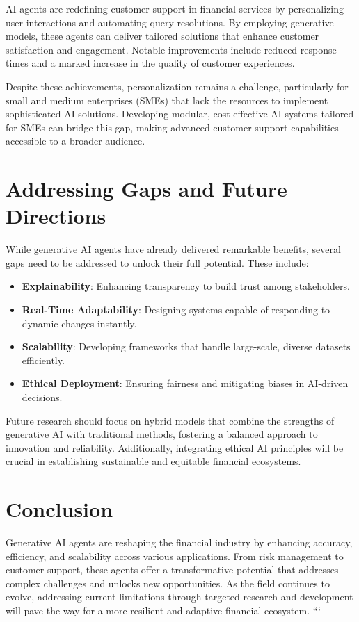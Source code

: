 \documentclass[a4paper,headinclude=on,footinclude=on,12pt,oneside]{scrbook}
\begin{document}
AI agents are redefining customer support in financial services by personalizing user interactions and automating query resolutions. By employing generative models, these agents can deliver tailored solutions that enhance customer satisfaction and engagement. Notable improvements include reduced response times and a marked increase in the quality of customer experiences.

Despite these achievements, personalization remains a challenge, particularly for small and medium enterprises (SMEs) that lack the resources to implement sophisticated AI solutions. Developing modular, cost-effective AI systems tailored for SMEs can bridge this gap, making advanced customer support capabilities accessible to a broader audience.

\section{Addressing Gaps and Future Directions}

While generative AI agents have already delivered remarkable benefits, several gaps need to be addressed to unlock their full potential. These include:

\begin{itemize}
	\item \textbf{Explainability}: Enhancing transparency to build trust among stakeholders.
	\item \textbf{Real-Time Adaptability}: Designing systems capable of responding to dynamic changes instantly.
	\item \textbf{Scalability}: Developing frameworks that handle large-scale, diverse datasets efficiently.
	\item \textbf{Ethical Deployment}: Ensuring fairness and mitigating biases in AI-driven decisions.
\end{itemize}

Future research should focus on hybrid models that combine the strengths of generative AI with traditional methods, fostering a balanced approach to innovation and reliability. Additionally, integrating ethical AI principles will be crucial in establishing sustainable and equitable financial ecosystems.

\section{Conclusion}

Generative AI agents are reshaping the financial industry by enhancing accuracy, efficiency, and scalability across various applications. From risk management to customer support, these agents offer a transformative potential that addresses complex challenges and unlocks new opportunities. As the field continues to evolve, addressing current limitations through targeted research and development will pave the way for a more resilient and adaptive financial ecosystem.
```
\end{document}
